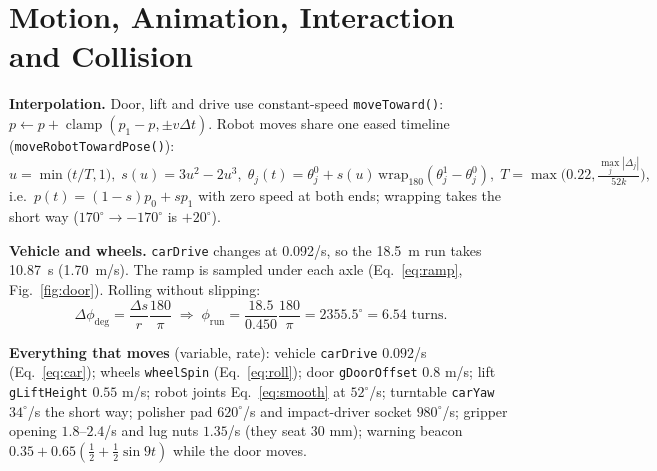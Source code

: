 \documentclass[10pt,a4paper]{article}
\newcommand{\fn}[1]{\texttt{#1}}
\begin{document}
\section{Motion, Animation, Interaction and Collision}\label{sec:motion}
\textbf{Interpolation.} Door, lift and drive use constant-speed \fn{moveToward()}: $p\leftarrow p+\operatorname{clamp}(p_1-p,\pm v\Delta t)$.
Robot moves share one eased timeline (\fn{moveRobotTowardPose()}):
\begin{equation}u=\min\!\big(t/T,1\big),\;s(u)=3u^2-2u^3,\;\theta_j(t)=\theta_j^0+s(u)\,\text{wrap}_{180}(\theta_j^1-\theta_j^0),\;
T=\max\!\Big(0.22,\tfrac{\max_j|\Delta_j|}{52k}\Big),\label{eq:smooth}\end{equation}
i.e.\ $p(t)=(1-s)p_0+sp_1$ with zero speed at both ends; wrapping takes the short way ($170^\circ\to-170^\circ$ is $+20^\circ$).

\textbf{Vehicle and wheels.} \fn{carDrive} changes at 0.092/s, so the \SI{18.5}{m} run takes \SI{10.87}{s} (\SI{1.70}{m/s}). The ramp is
sampled under each axle (Eq.~\eqref{eq:ramp}, Fig.~\ref{fig:door}). Rolling without slipping:
\begin{equation}\Delta\phi_{\deg}=\frac{\Delta s}{r}\frac{180}{\pi}\;\Rightarrow\;\phi_{\text{run}}=\frac{18.5}{0.450}\frac{180}{\pi}=2355.5^\circ=6.54\text{ turns}.\label{eq:roll}\end{equation}

\textbf{Everything that moves} (variable, rate): vehicle \fn{carDrive} $0.092$/s (Eq.~\eqref{eq:car}); wheels \fn{wheelSpin} (Eq.~\eqref{eq:roll}); door \fn{gDoorOffset} $0.8$ m/s;
lift \fn{gLiftHeight} $0.55$ m/s; robot joints Eq.~\eqref{eq:smooth} at $52^\circ$/s; turntable \fn{carYaw} $34^\circ$/s the short way; polisher pad $620^\circ$/s and impact-driver socket $980^\circ$/s;
gripper opening $1.8$--$2.4$/s and lug nuts $1.35$/s (they seat $30$ mm); warning beacon $0.35+0.65(\tfrac12+\tfrac12\sin9t)$ while the door moves.
\end{document}
